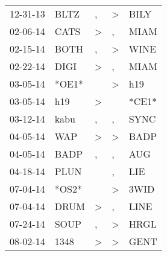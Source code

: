 \begin{supertabular}{p{0.07\textwidth}p{0.06\textwidth}p{0.02\textwidth}p{0.02\textwidth}p{0.06\textwidth}}
          12-31-13\textsuperscript{} &           BLTZ\textsuperscript{} &                , &     \textgreater &           BILY\textsuperscript{} \\
          02-06-14\textsuperscript{} &           CATS\textsuperscript{} &     \textgreater &                , &           MIAM\textsuperscript{} \\
          02-15-14\textsuperscript{} &           BOTH\textsuperscript{} &                , &     \textgreater &           WINE\textsuperscript{} \\
          02-22-14\textsuperscript{} &           DIGI\textsuperscript{} &     \textgreater &                , &           MIAM\textsuperscript{} \\
          03-05-14\textsuperscript{} &                            *OE1* &                  &     \textgreater &            h19\textsuperscript{} \\
          03-05-14\textsuperscript{} &            h19\textsuperscript{} &     \textgreater &                  &                            *CE1* \\
          03-12-14\textsuperscript{} &           kabu\textsuperscript{} &                , &                , &           SYNC\textsuperscript{} \\
          04-05-14\textsuperscript{} &            WAP\textsuperscript{} &     \textgreater &     \textgreater &           BADP\textsuperscript{} \\
          04-05-14\textsuperscript{} &           BADP\textsuperscript{} &                , &                , &            AUG\textsuperscript{} \\
          04-18-14\textsuperscript{} &           PLUN\textsuperscript{} &                  &                , &            LIE\textsuperscript{} \\
          07-04-14\textsuperscript{} &                            *OS2* &                  &     \textgreater &           3WID\textsuperscript{} \\
          07-04-14\textsuperscript{} &           DRUM\textsuperscript{} &     \textgreater &                , &           LINE\textsuperscript{} \\
          07-24-14\textsuperscript{} &           SOUP\textsuperscript{} &                , &     \textgreater &           HRGL\textsuperscript{} \\
          08-02-14\textsuperscript{} &           1348\textsuperscript{} &     \textgreater &     \textgreater &           GENT\textsuperscript{} \\

\end{supertabular}

